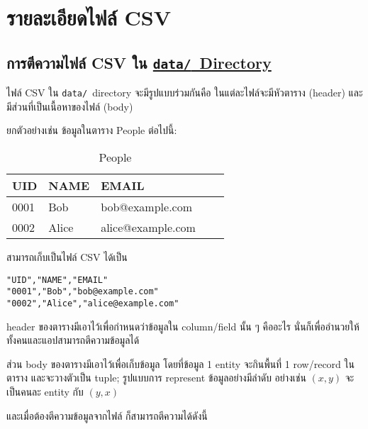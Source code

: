 \section{รายละเอียดไฟล์ CSV}

\subsection{การตีความไฟล์ CSV ใน \href{https://github.com/CS211-651/project211-oakcoding/tree/9397d355461933fb007261e2ee97445ea93eacc1/data}{\texttt{data\slash}~Directory}}

ไฟล์ CSV ใน \texttt{data\slash}~directory จะมีรูปแบบร่วมกันคือ
ในแต่ละไฟล์จะมีหัวตาราง (header) และมีส่วนที่เป็นเนื้อหาของไฟล์ (body)

ยกตัวอย่างเช่น ข้อมูลในตาราง People ต่อไปนี้:

\begin{table}[!htb]
\vspace{-\baselineskip}
\begin{tabular}{| l | l | l | l | l |}
\hline
\textbf{UID}    & \textbf{NAME}     & \textbf{EMAIL}\\
\hline\hline
0001            & Bob               & bob@example.com\\
\hline
0002            & Alice             & alice@example.com\\
\hline
\end{tabular}
\vspace{-\baselineskip}\caption{People}\label{tab:people}%
\end{table}

สามารถเก็บเป็นไฟล์ CSV ได้เป็น

\begin{lstlisting}[caption={\texttt{people.csv}},label={lst:people.csv}]
"UID","NAME","EMAIL"
"0001","Bob","bob@example.com"
"0002","Alice","alice@example.com"
\end{lstlisting}

header ของตารางมีเอาไว้เพื่อกำหนดว่าข้อมูลใน column/field นั้น ๆ คืออะไร
นั่นก็เพื่ออำนวยให้ทั้งคนและแอปสามารถตีความข้อมูลได้

ส่วน body ของตารางมีเอาไว้เพื่อเก็บข้อมูล โดยที่ข้อมูล 1 entity จะกินพื้นที่ 1 row/record ในตาราง
และจะวางตัวเป็น tuple; รูปแบบการ represent ข้อมูลอย่างมีลำดับ อย่างเช่น $ (x, y) $ จะเป็นคนละ entity กับ $ (y, x) $

และเมื่อต้องตีความข้อมูลจากไฟล์  ก็สามารถตีความได้ดังนี้

